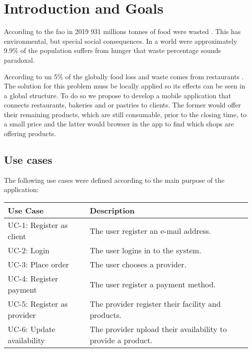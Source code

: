 \section{Introduction and Goals}

According to the \acrfull{fao} in 2019 931 millions tonnes of food were wasted \cite{refart:FAOFW}. This has
environmental, but special social consequences. In a world were approximately 9.9\% of the \cite{refart:AAHWH}
population suffers from hunger that waste percentage sounds paradoxal.

According to \acrfull{un} 5\% of the globally food loss and waste comes from restaurants \cite{refart:UNSP}. 
The solution for this problem muss be locally applied so its effects can be seen in a global structure. To do so we
propose to develop a mobile application that connects restaurants, bakeries and or pastries to clients. 
The former would offer their remaining products, which are still consumable, prior to the closing time, to a small price 
and the latter would browser in the app to find which shops are offering products. 

 
\subsection*{Use cases}

The following use cases were defined according to the main purpose of the application:


\begin{table}[htb]
    \begin{tabularx}{\textwidth}{lX}
    \toprule
    Use Case & Description  \\
    \midrule
    UC-1: Register as client & The user register an e-mail address.\\
    UC-2: Login & The user logins in to the system. \\
    UC-3: Place order & The user chooses a provider. \\
    UC-4: Register payment & The user register a payment method. \\
    UC-5: Register as provider & The provider register their facility and products. \\
    UC-6: Update availability & The provider upload their availability to provide a product. \\
    \bottomrule
    \end{tabularx}
\end{table}

